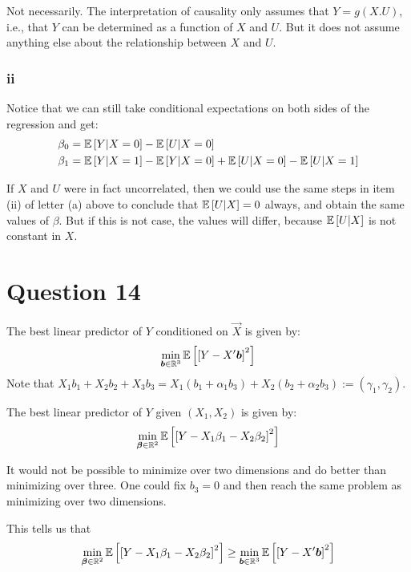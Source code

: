 \documentclass[12pt]{paper}
\begin{document}
Not necessarily. The interpretation of causality only assumes that $Y=g(X.U)$, i.e., that $Y$ can be determined as a function of $X$ and $U$. But it does not assume anything else about the relationship between $X$ and $U$.

\subsubsection*{ii}

Notice that we can still take conditional expectations on both sides of the regression and get:
\begin{equation}
\begin{split}
\beta_0&=\mathbb{E} \left [ Y|X=0 \right ]-\mathbb{E} \left [ U|X=0 \right ]\\
\beta_1&=\mathbb{E} \left [ Y|X=1 \right ]-\mathbb{E} \left [ Y|X=0 \right ]+\mathbb{E} \left [ U|X=0 \right ]-\mathbb{E} \left [ U|X=1 \right ]\\
\end{split}
\end{equation}

If $X$ and $U$ were in fact uncorrelated, then we could use the same steps in item (ii) of letter (a) above to conclude that $\mathbb{E} \left [ U|X \right ]=0$ always, and obtain the same values of $\beta$. But if this is not case, the values will differ, because $\mathbb{E} \left [ U|X \right ]$ is not constant in $X$.

\section*{Question 14}

The best linear predictor of $Y$ conditioned on $\vec{X}$ is given by:
\begin{equation*}
  \min_{\bm{ b } \in \mathbb{R}^3} \mathbb{E} \left [  \left [ Y - X' \bm{ b } \right ]^2 \right ]
\end{equation*}
Note that $X_1 b_1 + X_2 b_2 + X_3 b_3 = X_1 \left( b_1
  + \alpha_1 b_3 \right) + X_2 \left( b_2 + \alpha_2 b_3  \right) := ( \gamma_1, \gamma_2)$. 


The best linear predictor of $Y$ given $(X_1,X_2)$ is given by:
\begin{equation*}
  \min_{\bm{ \beta } \in \mathbb{R}^2} \mathbb{E} \left [  \left [  Y - X_1 \beta_1 - X_2 \beta_2 \right ]^2 \right ]
\end{equation*}

It would not be possible to minimize over two dimensions and do better
than minimizing over three. One could fix $b_3 = 0$ and then reach
the same problem as minimizing over two dimensions.

This tells us that
\begin{equation*}
  \min_{\bm{ \beta } \in \mathbb{R}^2} \mathbb{E} \left [  \left [  Y - X_1 \beta_1 - X_2 \beta_2 \right ]^2 \right ] \geq
  \min_{\bm{ b } \in \mathbb{R}^3} \mathbb{E} \left [  \left [ Y - X' \bm{ b } \right ]^2 \right ]
\end{equation*}
\end{document}

